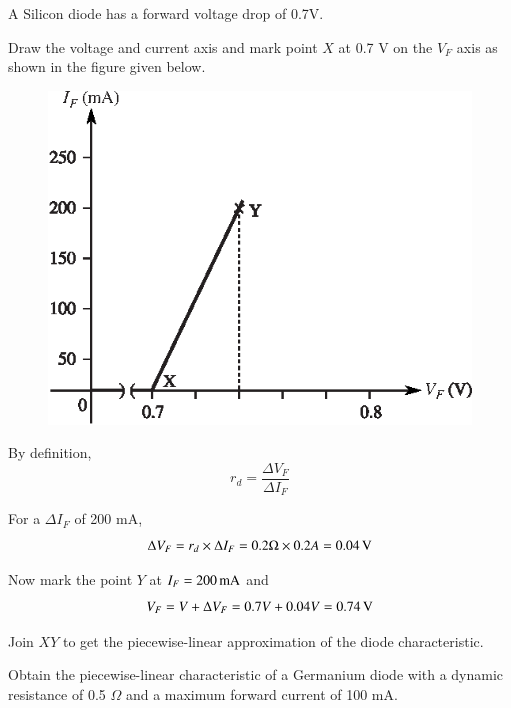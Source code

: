 \begin{solution}
A Silicon diode has a forward voltage drop of 0.7V.

Draw the voltage and current axis and mark point $X$ at 0.7 V on the
$V_F$ axis as shown in the figure given below.
\begin{figure}[H]
\centering
\includegraphics{chap1/S3-EE-01-026.eps}
\end{figure}

By definition, 
$$
r_d = \frac{\Delta V_F}{\Delta I_F}
$$

For a $\Delta I_F$ of 200 mA,
$$
\Delta V_F = r_d \times \Delta I_F = 0.2\Omega \times 0.2A = 0.04 \operatorname{\mathrm{V}}
$$

Now mark the point $Y$ at $I_F = 200\operatorname{mA}$ and 
$$
V_F = V + \Delta V_F = 0.7V + 0.04V = 0.74 \operatorname{\mathrm{V}}
$$

Join $XY$ to get the piecewise-linear approximation of the diode
characteristic.
\end{solution}

\begin{example}\label{exam1.14}
Obtain the piecewise-linear characteristic of a Germanium diode with a
dynamic resistance of 0.5 $\Omega$ and a maximum forward current of
100 mA.
\end{example}

